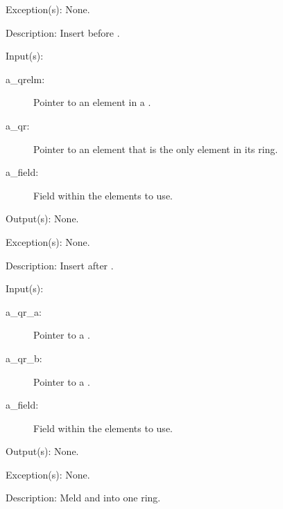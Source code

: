 \begin{capi}
\begin{capilist}
	\item[Exception(s): ] None.
	\item[Description: ]
		Insert  before .
	\end{capilist}
\label{qr_after_insert}
	\begin{capilist}
	\item[Input(s): ]
		\begin{description}\item[]
		\item[a\_qrelm: ]
			Pointer to an element in a .
		\item[a\_qr: ]
			Pointer to an element that is the only element in its
			ring.
		\item[a\_field: ]
			Field within the  elements to use.
		\end{description}
	\item[Output(s): ] None.
	\item[Exception(s): ] None.
	\item[Description: ]
		Insert  after .
	\end{capilist}
\label{qr_meld}
	\begin{capilist}
	\item[Input(s): ]
		\begin{description}\item[]
		\item[a\_qr\_a: ]
			Pointer to a \classname{qr}.
		\item[a\_qr\_b: ]
			Pointer to a \classname{qr}.
		\item[a\_field: ]
			Field within the  elements to use.
		\end{description}
	\item[Output(s): ] None.
	\item[Exception(s): ] None.
	\item[Description: ]
		Meld  and  into one ring.
	\end{capilist}
\label{qr_split}
	\begin{capilist}

\end{capilist}
\end{capi}
